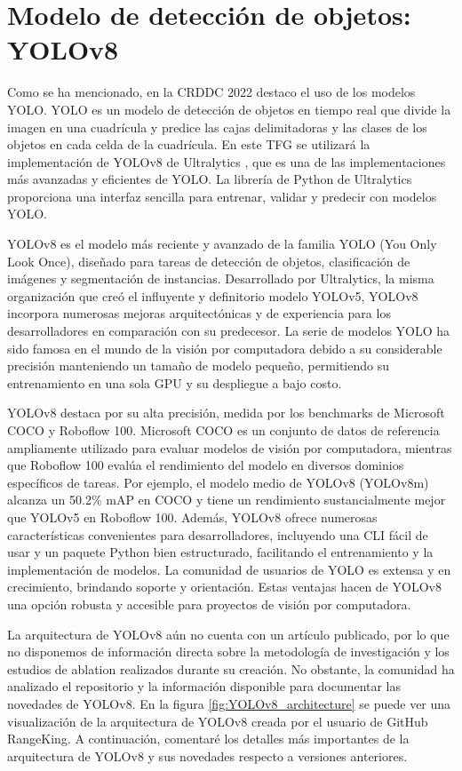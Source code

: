 \section{Modelo de detección de objetos: YOLOv8}
Como se ha mencionado, en la CRDDC 2022 destaco el uso de los modelos YOLO. YOLO \cite{YOLO} es un modelo de detección de objetos en tiempo real que divide la imagen en una cuadrícula y predice las cajas delimitadoras y las clases de los objetos en cada celda de la cuadrícula. En este TFG se utilizará la implementación de YOLOv8 de Ultralytics \cite{yolov8_ultralytics}, que es una de las implementaciones más avanzadas y eficientes de YOLO. La librería de Python de Ultralytics proporciona una interfaz sencilla para entrenar, validar y predecir con modelos YOLO.

YOLOv8 es el modelo más reciente y avanzado de la familia YOLO (You Only Look Once), diseñado para tareas de detección de objetos, clasificación de imágenes y segmentación de instancias. Desarrollado por Ultralytics, la misma organización que creó el influyente y definitorio modelo YOLOv5, YOLOv8 incorpora numerosas mejoras arquitectónicas y de experiencia para los desarrolladores en comparación con su predecesor. La serie de modelos YOLO ha sido famosa en el mundo de la visión por computadora debido a su considerable precisión manteniendo un tamaño de modelo pequeño, permitiendo su entrenamiento en una sola GPU y su despliegue a bajo costo.

YOLOv8 destaca por su alta precisión, medida por los benchmarks de Microsoft COCO y Roboflow 100. Microsoft COCO es un conjunto de datos de referencia ampliamente utilizado para evaluar modelos de visión por computadora, mientras que Roboflow 100 evalúa el rendimiento del modelo en diversos dominios específicos de tareas. Por ejemplo, el modelo medio de YOLOv8 (YOLOv8m) alcanza un 50.2\% mAP en COCO y tiene un rendimiento sustancialmente mejor que YOLOv5 en Roboflow 100. Además, YOLOv8 ofrece numerosas características convenientes para desarrolladores, incluyendo una CLI fácil de usar y un paquete Python bien estructurado, facilitando el entrenamiento y la implementación de modelos. La comunidad de usuarios de YOLO es extensa y en crecimiento, brindando soporte y orientación. Estas ventajas hacen de YOLOv8 una opción robusta y accesible para proyectos de visión por computadora.

La arquitectura de YOLOv8 aún no cuenta con un artículo publicado, por lo que no disponemos de información directa sobre la metodología de investigación y los estudios de ablation realizados durante su creación. No obstante, la comunidad ha analizado el repositorio y la información disponible para documentar las novedades de YOLOv8. En la figura \ref{fig:YOLOv8_architecture} se puede ver una visualización de la arquitectura de YOLOv8 creada por el usuario de GitHub RangeKing\cite{RangeKing_GitHub}. A continuación, comentaré los detalles más importantes de la arquitectura de YOLOv8 y sus novedades respecto a versiones anteriores. \cite{whats-new-in-yolov8} \cite{yolov8-architecture-blog} \cite{yolov8-architecture-blog2}


